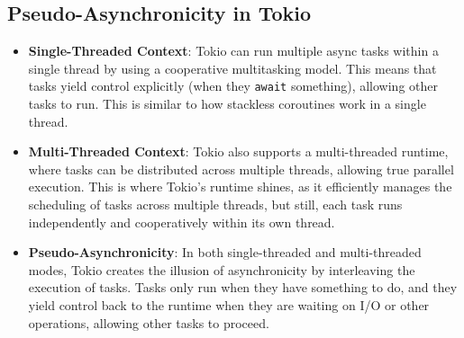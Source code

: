 \documentclass{article}
\begin{document}
\subsection{Pseudo-Asynchronicity in Tokio}
\begin{itemize}
    \item \textbf{Single-Threaded Context}: Tokio can run multiple async tasks within a single thread by using a cooperative multitasking model. This means that tasks yield control explicitly (when they \texttt{await} something), allowing other tasks to run. This is similar to how stackless coroutines work in a single thread.
    \item \textbf{Multi-Threaded Context}: Tokio also supports a multi-threaded runtime, where tasks can be distributed across multiple threads, allowing true parallel execution. This is where Tokio's runtime shines, as it efficiently manages the scheduling of tasks across multiple threads, but still, each task runs independently and cooperatively within its own thread.
    \item \textbf{Pseudo-Asynchronicity}: In both single-threaded and multi-threaded modes, Tokio creates the illusion of asynchronicity by interleaving the execution of tasks. Tasks only run when they have something to do, and they yield control back to the runtime when they are waiting on I/O or other operations, allowing other tasks to proceed.
\end{itemize}
\end{document}
